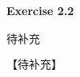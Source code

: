 \documentclass{article}
\begin{document}
	\paragraph*{Exercise 2.2} $\boxed{\text{待补充}} $
	
	【待补充】
	
\end{document}
